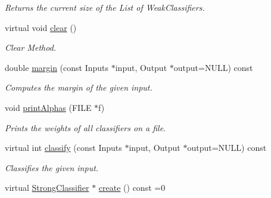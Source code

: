 \begin{DoxyCompactItemize}
\begin{DoxyCompactList}\small\item\em Returns the current size of the List of Weak\+Classifiers. \end{DoxyCompactList}\item 
virtual void \hyperlink{classiCub_1_1boostMIL_1_1StrongClassifier_a01b6ff00adc73d01d1b6ebca017a8014}{clear} ()
\begin{DoxyCompactList}\small\item\em Clear Method. \end{DoxyCompactList}\item 
double \hyperlink{classiCub_1_1boostMIL_1_1StrongClassifier_acd33ed5cc98ed84a61e27b41eec63c5c}{margin} (const Inputs $\ast$input, Output $\ast$output=N\+U\+L\+L) const 
\begin{DoxyCompactList}\small\item\em Computes the margin of the given input. \end{DoxyCompactList}\item 
void \hyperlink{classiCub_1_1boostMIL_1_1StrongClassifier_acdfb5551c7b9315ab4077566809064fc}{print\+Alphas} (F\+I\+L\+E $\ast$f)
\begin{DoxyCompactList}\small\item\em Prints the weights of all classifiers on a file. \end{DoxyCompactList}\item 
virtual int \hyperlink{classiCub_1_1boostMIL_1_1StrongClassifier_a1fee2d421c908292846b6e7356c7c6d1}{classify} (const Inputs $\ast$input, Output $\ast$output=N\+U\+L\+L) const 
\begin{DoxyCompactList}\small\item\em Classifies the given input. \end{DoxyCompactList}\item 
virtual \hyperlink{classiCub_1_1boostMIL_1_1StrongClassifier}{Strong\+Classifier} $\ast$ \hyperlink{classiCub_1_1boostMIL_1_1StrongClassifier_a27969f5c6204f2195e7a13c40120d92e}{create} () const =0\label{classiCub_1_1boostMIL_1_1StrongClassifier_a27969f5c6204f2195e7a13c40120d92e}


\end{DoxyCompactItemize}

